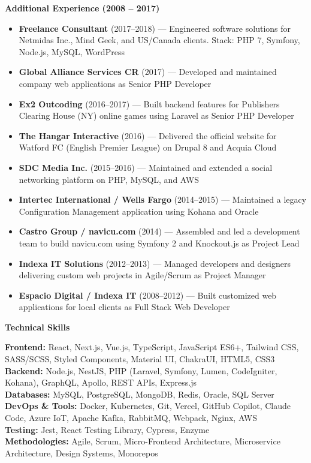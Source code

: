 \documentclass[11pt]{article}
\begin{document}
\begin{center}
    \textbf{Additional Experience (2008 -- 2017)}
\end{center}
\begin{itemize}[noitemsep, topsep=0pt, partopsep=0pt, parsep=0pt]
    \item \textbf{Freelance Consultant} (2017--2018) --- Engineered software solutions for Netmidas Inc., Mind Geek, and US/Canada clients. Stack: PHP 7, Symfony, Node.js, MySQL, WordPress
    \item \textbf{Global Alliance Services CR} (2017) --- Developed and maintained company web applications as Senior PHP Developer
    \item \textbf{Ex2 Outcoding} (2016--2017) --- Built backend features for Publishers Clearing House (NY) online games using Laravel as Senior PHP Developer
    \item \textbf{The Hangar Interactive} (2016) --- Delivered the official website for Watford FC (English Premier League) on Drupal 8 and Acquia Cloud
    \item \textbf{SDC Media Inc.} (2015--2016) --- Maintained and extended a social networking platform on PHP, MySQL, and AWS
    \item \textbf{Intertec International / Wells Fargo} (2014--2015) --- Maintained a legacy Configuration Management application using Kohana and Oracle
    \item \textbf{Castro Group / navicu.com} (2014) --- Assembled and led a development team to build navicu.com using Symfony 2 and Knockout.js as Project Lead
    \item \textbf{Indexa IT Solutions} (2012--2013) --- Managed developers and designers delivering custom web projects in Agile/Scrum as Project Manager
    \item \textbf{Espacio Digital / Indexa IT} (2008--2012) --- Built customized web applications for local clients as Full Stack Web Developer
\end{itemize}

\vspace{12pt}

\begin{center}
    \textbf{Technical Skills}
\end{center}
\textbf{Frontend:} React, Next.js, Vue.js, TypeScript, JavaScript ES6+, Tailwind CSS, SASS/SCSS, Styled Components, Material UI, ChakraUI, HTML5, CSS3\\
\textbf{Backend:} Node.js, NestJS, PHP (Laravel, Symfony, Lumen, CodeIgniter, Kohana), GraphQL, Apollo, REST APIs, Express.js\\
\textbf{Databases:} MySQL, PostgreSQL, MongoDB, Redis, Oracle, SQL Server\\
\textbf{DevOps \& Tools:} Docker, Kubernetes, Git, Vercel, GitHub Copilot, Claude Code, Azure IoT, Apache Kafka, RabbitMQ, Webpack, Nginx, AWS\\
\textbf{Testing:} Jest, React Testing Library, Cypress, Enzyme\\
\textbf{Methodologies:} Agile, Scrum, Micro-Frontend Architecture, Microservice Architecture, Design Systems, Monorepos
\end{document}

